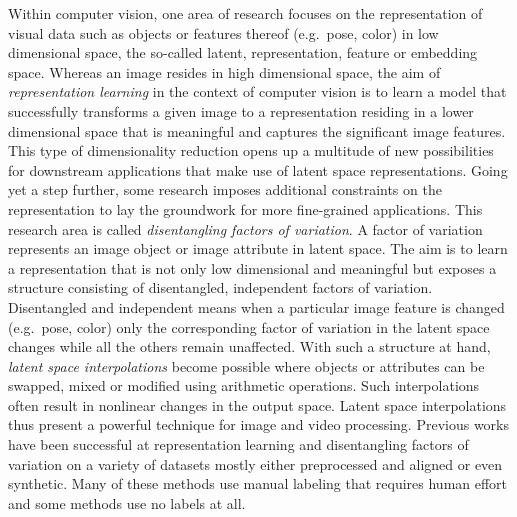 \documentclass[a4paper,12pt]{report}
\begin{document}
Within computer vision, one area of research focuses on the representation of visual data such as objects or features thereof (e.g.\ pose, color) in low dimensional space, the so-called latent, representation, feature or embedding space. Whereas an image resides in high dimensional space, the aim of \textit{representation learning} in the context of computer vision is to learn a model that successfully transforms a given image to a representation residing in a lower dimensional space that is meaningful and captures the significant image features. This type of dimensionality reduction opens up a multitude of new possibilities for downstream applications that make use of latent space representations. Going yet a step further, some research imposes additional constraints on the representation to lay the groundwork for more fine-grained applications. This research area is called \textit{disentangling factors of variation}. A factor of variation represents an image object or image attribute in latent space. The aim is to learn a representation that is not only low dimensional and meaningful but exposes a structure consisting of disentangled, independent factors of variation. Disentangled and independent means when a particular image feature is changed (e.g.\ pose, color) only the corresponding factor of variation in the latent space changes while all the others remain unaffected. With such a structure at hand, \textit{latent space interpolations} become possible where objects or attributes can be swapped, mixed or modified using arithmetic operations. Such interpolations often result in nonlinear changes in the output space. Latent space interpolations thus present a powerful technique for image and video processing. Previous works have been successful at representation learning and disentangling factors of variation on a variety of datasets mostly either preprocessed and aligned or even synthetic. Many of these methods use manual labeling that requires human effort and some methods use no labels at all.
\end{document}
